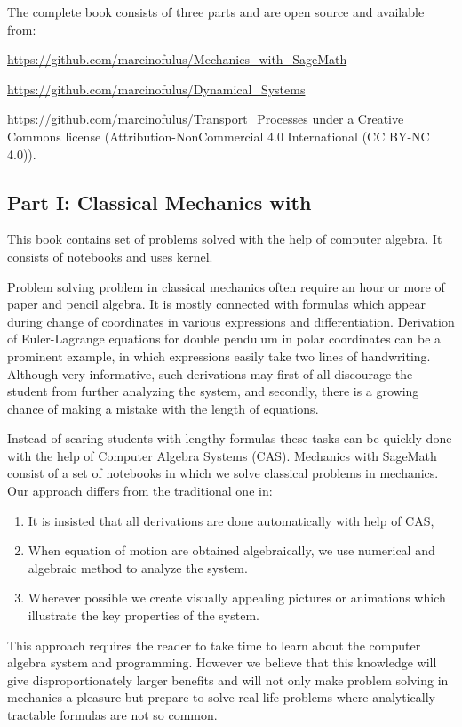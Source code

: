 \documentclass{deliverablereport}
\begin{document}
The complete book consists of three parts and are  open source and available from:\newline
{\url{https://github.com/marcinofulus/Mechanics_with_SageMath}\linebreak
{\url{https://github.com/marcinofulus/Dynamical_Systems}\linebreak
{\url{https://github.com/marcinofulus/Transport_Processes}\linebreak
under a Creative Commons license (Attribution-NonCommercial 4.0
International (CC BY-NC 4.0)).

\subsection{Part I: Classical Mechanics with \Sage}

This book contains set of problems solved with the help of computer
algebra. It consists of \Jupyter notebooks and uses  \Sage kernel.

Problem solving problem in classical mechanics often require an hour
or more of paper and pencil algebra. It is mostly connected with
formulas which appear during change of coordinates in various
expressions and differentiation. Derivation of Euler-Lagrange
equations for double pendulum in polar coordinates can be a prominent
example, in which expressions easily take two lines of handwriting. 
Although very informative, such derivations may first of all discourage
the student from further analyzing the system, and secondly, there is
a growing chance of making a mistake with the length of equations.

Instead of scaring students with lengthy formulas these tasks can be
quickly done with the help of Computer Algebra Systems
(CAS). Mechanics with SageMath consist of a set of notebooks in which
we solve classical problems in mechanics. Our approach differs from
the traditional one in:
\begin{enumerate}
\item It is insisted that all derivations are done automatically with
  help of CAS,
\item When equation of motion are obtained algebraically, we use
  numerical and algebraic method to analyze the system.
\item Wherever possible we create visually appealing pictures or
  animations which illustrate the key properties of the system.
\end{enumerate}

This approach requires the reader to take time to learn about the
computer algebra system and programming. However we believe that this
knowledge will give disproportionately larger benefits and will not
only make problem solving in mechanics a pleasure but prepare to solve
real life problems where analytically tractable formulas are not so
common.



}}}
\end{document}
